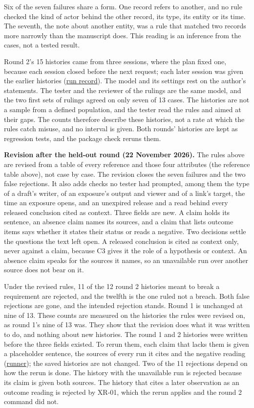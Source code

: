 \documentclass[
  11pt,
]{article}
\begin{document}
Six of the seven failures share a form. One record refers to another,
and no rule checked the kind of actor behind the other record, its type,
its entity or its time. The seventh, the note about another entity, was
a rule that matched two records more narrowly than the manuscript does.
This reading is an inference from the cases, not a tested result.

Round 2's 15 histories came from three sessions, where the plan fixed
one, because each session closed before the next request; each later
session was given the earlier histories
(\href{tools/adversarial_cases/round2/RUN_RECORD.md}{run record}). The
model and its settings rest on the author's statements. The tester and
the reviewer of the rulings are the same model, and the two first sets
of rulings agreed on only seven of 13 cases. The histories are not a
sample from a defined population, and the tester read the rules and
aimed at their gaps. The counts therefore describe these histories, not
a rate at which the rules catch misuse, and no interval is given. Both
rounds' histories are kept as regression tests, and the package check
reruns them.

\textbf{Revision after the held-out round (22 November 2026).} The rules
above are revised from a table of every reference and those four
attributes (the reference table above), not case by case. The revision
closes the seven failures and the two false rejections. It also adds
checks no tester had prompted, among them the type of a draft's writer,
of an exposure's output and viewer and of a link's target, the time an
exposure opens, and an unexpired release and a read behind every
released conclusion cited as context. Three fields are new. A claim
holds its sentence, an absence claim names its sources, and a claim that
lists outcome items says whether it states their status or reads a
negative. Two decisions settle the questions the text left open. A
released conclusion is cited as context only, never against a claim,
because C3 gives it the role of a hypothesis or context. An absence
claim speaks for the sources it names, so an unavailable run over
another source does not bear on it.

Under the revised rules, 11 of the 12 round 2 histories meant to break a
requirement are rejected, and the twelfth is the one ruled not a breach.
Both false rejections are gone, and the intended rejection stands. Round
1 is unchanged at nine of 13. These counts are measured on the histories
the rules were revised on, as round 1's nine of 13 was. They show that
the revision does what it was written to do, and nothing about new
histories. The round 1 and 2 histories were written before the three
fields existed. To rerun them, each claim that lacks them is given a
placeholder sentence, the sources of every run it cites and the negative
reading (\href{tools/adversarial_cases/run_cases.py}{runner}); the saved
histories are not changed. Two of the 11 rejections depend on how the
rerun is done. The history with the unavailable run is rejected because
its claim is given both sources. The history that cites a later
observation as an outcome reading is rejected by \mbox{XR-01}, which the
rerun applies and the round 2 command did not.
\end{document}
